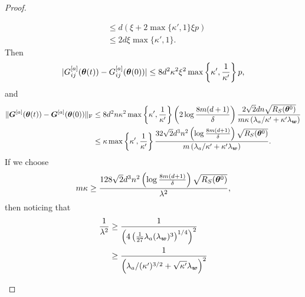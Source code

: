 \documentclass{article}
\begin{document}
\begin{proof}
\begin{enumerate}[(a)]
\begin{enumerate}[(i)]
\begin{equation*}
\begin{aligned}
                                 & \leq d\left(\xi+2\max\{\kappa',1\}\xi p\right)                                    \\
                                 & \leq 2d\xi\max\{\kappa',1\}.
                            \end{aligned}
                        \end{equation*}
                        Then
                        \begin{equation*}
                            \lvert G_{ij}^{[a]}(\bm{\theta}(t)) - G_{ij}^{[a]}(\bm{\theta}(0))\rvert \leq 8d^2\kappa^2\xi^2\max\left\{\kappa',\frac{1}{\kappa'}\right\}p,
                        \end{equation*}
                        and
                        \begin{equation*}
                            \begin{aligned}
                                \lVert\bm{G}^{[a]}(\bm{\theta}(t)) - \bm{G}^{[a]}(\bm{\theta}(0))\rVert_\mathrm{F}
                                 & \leq 8d^2n\kappa^2\max\left\{\kappa',\frac{1}{\kappa'}\right\}\left(2\log\frac{8m(d+1)}{\delta}\right)\frac{2\sqrt{2}dn\sqrt{R_S(\bm{\theta}^0)}}{m\kappa\left(\lambda_a/\kappa'+\kappa'\lambda_{\bm{w}}\right)} \\
                                 & \leq\kappa\max\left\{\kappa',\frac{1}{\kappa'}\right\}\frac{32\sqrt{2}d^3n^2\left(\log\frac{8m(d+1)}{\delta}\right)\sqrt{R_S(\bm{\theta}^0)}}{m\left(\lambda_a/\kappa'+\kappa'\lambda_{\bm{w}}\right)}.
                            \end{aligned}
                        \end{equation*}
                        If we choose
                        \begin{equation}\label{cond:m1}
                            m\kappa\geq\frac{128\sqrt{2}d^3n^2\left(\log\frac{8m(d+1)}{\delta}\right)\sqrt{R_S(\bm{\theta}^0)}}{\lambda^2},
                        \end{equation}
                        then noticing that
                        \begin{equation*}
                            \begin{aligned}
                                \frac{1}{\lambda^2}
                                 & \geq\frac{1}{\left(4\left(\frac{1}{27}\lambda_a(\lambda_{\vw})^3\right)^{1/4}\right) ^2} \\
                                 & \geq\frac{1}{\left(\lambda_a/(\kappa')^{3/2}+\sqrt{\kappa'}\lambda_{\vw}\right)^2}                \\

\end{aligned}
\end{equation*}
\end{enumerate}
\end{enumerate}
\end{proof}
\end{document}
